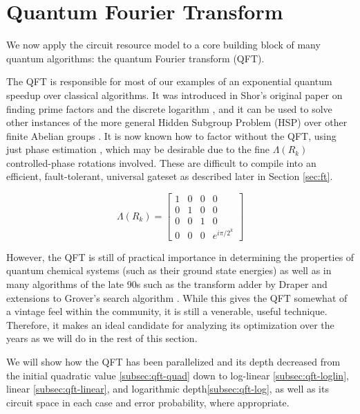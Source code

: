 \section{Quantum Fourier Transform}
\label{sec:qft}

We now apply the circuit resource model to a core building block of
many quantum algorithms: the quantum Fourier transform (QFT).

The QFT is responsible for most of our examples of an exponential quantum
speedup over classical algorithms. It was introduced in Shor's
original paper on finding prime factors and the discrete logarithm
\cite{Shor1995}, and it can be used to solve
other instances of the more general Hidden Subgroup Problem (HSP)
\cite{Lomont2004} over other finite Abelian groups \cite{Nielsen2000}.
It is now known
how to factor without the QFT,
using just phase estimation \cite{Kitaev2002} \cite{Cleve2000}, which may
be desirable due to the fine $\Lambda(R_k)$ controlled-phase rotations involved.
These are difficult to compile into an efficient, fault-tolerant, universal
gateset as described later in Section \ref{sec:ft}.

\begin{equation}
\label{eqn:rk}
\Lambda(R_k) = \left[ \begin{array}{cccc}
1 & 0 & 0 & 0\\
0 & 1 & 0 & 0\\
0 & 0 & 1 & 0\\
0 & 0 & 0 & e^{i\pi / 2^k}
\end{array}
\right]
\end{equation}

However, the QFT is still of practical importance
in determining the
properties of quantum chemical systems
(such as their ground state energies) \cite{Wang2008} as well as in
many algorithms of the late 90s such as
the transform adder by Draper \cite{Draper2000} and extensions to Grover's
search algorithm \cite{Grover1996} \cite{Brassard1998} \cite{Mosca1999}.
While this gives the QFT somewhat of a vintage feel within the community,
it is still a venerable, useful technique.
Therefore, it makes an ideal candidate for analyzing its optimization
over the years as we will do in the rest of this section.

We will show how the QFT has been parallelized and its depth decreased from the
initial quadratic
value \ref{subsec:qft-quad} down to
log-linear \ref{subsec:qft-loglin},
linear \ref{subsec:qft-linear}, and logarithmic depth\ref{subsec:qft-log},
as well as its circuit space in each case and error probability, where
appropriate.

